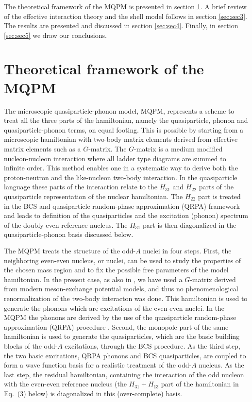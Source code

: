The theoretical framework of
the MQPM is presented in section \ref{sec:sec2}. 
A brief review of the effective
interaction theory and the shell model follows in 
section \ref{sec:sec3}. The results are presented and discussed in section 
\ref{sec:sec4}. Finally, in section \ref{sec:sec5} we draw our conclusions.

\section{Theoretical framework of the MQPM}\label{sec:sec2}

The microscopic quasiparticle-phonon model, MQPM, represents a 
scheme to treat all the three parts
of the hamiltonian, namely the quasiparticle, phonon and 
quasiparticle-phonon terms, on equal footing. This is possible by 
starting from a microscopic hamiltonian with two-body matrix elements 
derived from effective matrix elements such as a 
$G$-matrix. The $G$-matrix is a medium modified nucleon-nucleon
interaction where all ladder type diagrams are summed to infinite
order.
This method enables one in a systematic way to derive both 
the proton-neutron and the like-nucleon two-body interaction. 
In the 
quasiparticle language these parts of the interaction relate to the
$H_{31}$ and $H_{22}$ parts of the quasiparticle representation
of the nuclear hamiltonian. 
The $H_{22}$ part is treated in the BCS and
quasiparticle random-phase approximation (QRPA) framework and leads
to definition of the quasiparticles and the excitation (phonon) 
spectrum of the doubly-even reference nucleus. The $H_{31}$ part is then 
diagonalized in the quasiparticle-phonon basis discussed below.


The MQPM treats the structure
of the odd-$A$ nuclei in four steps. First, the neighboring even-even
nucleus, or nuclei, can be used to study the properties of the chosen
mass region and to fix the possible free parameters of the model
hamiltonian. In the present case, as also in \cite{HOL97},
we have used a $G$-matrix derived from modern meson-exchange
potential models, 
and thus no phenomenological renormalization of the two-body interacton 
was done. This hamiltonian is used to generate the phonons which
are excitations of the even-even nuclei. In the MQPM the phonons are
derived by the use of the quasiparticle
random-phase approximation (QRPA) procedure \cite{RIN80}. Second, the 
monopole part of the same hamiltonian is used to generate the 
quasiparticles, which are the 
basic building blocks of the odd-$A$ excitations,
through the BCS procedure. As the third step, the two basic 
excitations, QRPA phonons and BCS quasiparticles, are coupled to 
form a wave function basis for a realistic treatment of the 
odd-$A$ nucleus. As the last step, the residual hamiltonian, 
containing the interaction of the odd nucleon with the even-even 
reference nucleus (the $H_{31}+H_{13}$ part of the hamiltonian in Eq.\ (3)
below) is diagonalized in this (over-complete) basis.

